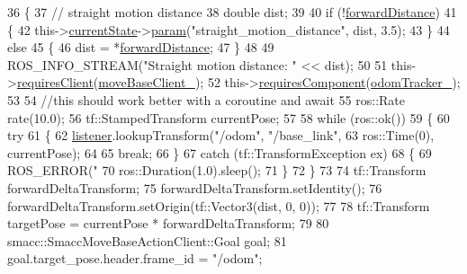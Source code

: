 \begin{DoxyCode}
36     \{
37         \textcolor{comment}{// straight motion distance}
38         \textcolor{keywordtype}{double} dist;
39 
40         \textcolor{keywordflow}{if} (!\hyperlink{classsm__dance__bot_1_1CbNavigateForward_a7aa9c05a79d2b0aa0f102ff06f579c07}{forwardDistance})
41         \{
42             this->\hyperlink{classsmacc_1_1SmaccClientBehavior_af76fc9b877542ed5caf033f820c107d0}{currentState}->\hyperlink{classsmacc_1_1ISmaccState_a4982f2187ed6da337462721146e8ef70}{param}(\textcolor{stringliteral}{"straight\_motion\_distance"}, dist, 3.5);
43         \}
44         \textcolor{keywordflow}{else}
45         \{
46             dist = *\hyperlink{classsm__dance__bot_1_1CbNavigateForward_a7aa9c05a79d2b0aa0f102ff06f579c07}{forwardDistance};
47         \}
48 
49         ROS\_INFO\_STREAM(\textcolor{stringliteral}{"Straight motion distance: "} << dist);
50 
51         this->\hyperlink{classsmacc_1_1SmaccClientBehavior_adc21bbd45d36bd81ca6f778ed161807a}{requiresClient}(\hyperlink{classsm__dance__bot_1_1CbNavigateForward_a5c07ee051da501dec97105fd66633259}{moveBaseClient\_});
52         this->\hyperlink{classsmacc_1_1SmaccClientBehavior_a011246bb1424f8bf8c9322f652db9d88}{requiresComponent}(\hyperlink{classsm__dance__bot_1_1CbNavigateForward_acaa4978c23fbc57fee5ee13a12842e7d}{odomTracker\_});
53 
54         \textcolor{comment}{//this should work better with a coroutine and await}
55         ros::Rate rate(10.0);
56         tf::StampedTransform currentPose;
57 
58         \textcolor{keywordflow}{while} (ros::ok())
59         \{
60             \textcolor{keywordflow}{try}
61             \{
62                 \hyperlink{classsm__dance__bot_1_1CbNavigateForward_a7bda457757f10a2e71eb15c07bf707b4}{listener}.lookupTransform(\textcolor{stringliteral}{"/odom"}, \textcolor{stringliteral}{"/base\_link"},
63                                          ros::Time(0), currentPose);
64 
65                 \textcolor{keywordflow}{break};
66             \}
67             \textcolor{keywordflow}{catch} (tf::TransformException ex)
68             \{
69                 ROS\_ERROR(\textcolor{stringliteral}{"%
70                 ros::Duration(1.0).sleep();
71             \}
72         \}
73 
74         tf::Transform forwardDeltaTransform;
75         forwardDeltaTransform.setIdentity();
76         forwardDeltaTransform.setOrigin(tf::Vector3(dist, 0, 0));
77 
78         tf::Transform targetPose = currentPose * forwardDeltaTransform;
79 
80         smacc::SmaccMoveBaseActionClient::Goal goal;
81         goal.target\_pose.header.frame\_id = \textcolor{stringliteral}{"/odom"};
}
\end{DoxyCode}
